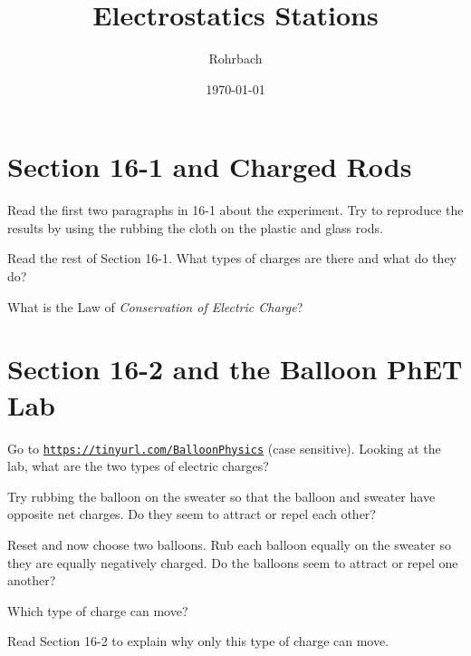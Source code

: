 \documentclass[10pt]{exam}
\title{Electrostatics Stations}
\author{Rohrbach}
\date{\today}
\begin{document}
\maketitle

\section{Section 16-1 and Charged Rods}

\begin{questions}
  \question
    Read the first two paragraphs in 16-1 about the experiment.  Try to reproduce the results by using the rubbing the cloth on the plastic and glass rods. 


  \question
    Read the rest of Section 16-1.  What types of charges are there and what do they do? \vs

  \question
    What is the Law of \emph{Conservation of Electric Charge}? \vs
   
\end{questions}

\section{Section 16-2 and the Balloon PhET Lab}

\begin{questions}
  \question
    Go to \href{https://tinyurl.com/BalloonPhysics}{\texttt{https://tinyurl.com/BalloonPhysics}} (case sensitive). Looking at the lab, what are the two types of electric charges? \vs

  \question
    Try rubbing the balloon on the sweater so that the balloon and sweater have opposite net charges.  Do they seem to attract or repel each other? \vs

  \question
    Reset and now choose two balloons.  Rub each balloon equally on the sweater so they are equally negatively charged.  Do the balloons seem to attract or repel one another? \vs

  \question
    Which type of charge can move? \vs

  \question
    Read Section 16-2 to explain why only this type of charge can move. \vs

\end{questions}
\end{document}
